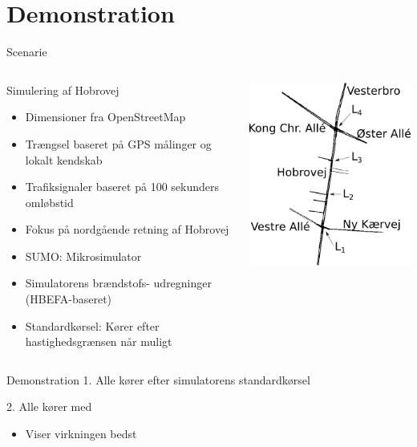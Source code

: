 \section{Demonstration}
\begin{frame}{Scenarie}
\begin{columns}
\begin{column}{0.6\textwidth}
Simulering af Hobrovej
\begin{itemize}
\item Dimensioner fra OpenStreetMap
\item Trængsel baseret på GPS målinger og lokalt kendskab
\item Trafiksignaler baseret på 100 sekunders omløbstid
\item Fokus på nordgående retning af Hobrovej
\item SUMO: Mikrosimulator
\item Simulatorens brændstofs- udregninger (HBEFA-baseret)
\item Standardkørsel: Kører efter hastighedsgrænsen når muligt
\end{itemize}
\end{column}

\begin{column}{0.5\textwidth}
\includegraphics[width=1\textwidth]{../images/HobrovejNy.png}
\end{column}
\end{columns}
\end{frame}

\begin{frame}{Demonstration}
1. Alle kører efter simulatorens standardkørsel
\vspace{4mm}

2. Alle kører med \tech
\begin{itemize}
\item Viser virkningen bedst
\end{itemize}
\end{frame}